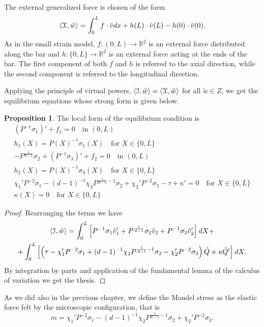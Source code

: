 \documentclass[a4paper,10pt,oneside]{amsbook}
\numberwithin{section}{chapter}
\numberwithin{equation}{chapter}
\theoremstyle{definition}
\newtheorem{prop}{Proposition}[chapter]
\DeclarePairedDelimiter{\dual}{\langle}{\rangle}
\begin{document}
The external generalized force is chosen of the form
\[
\dual{\mathcal X,\tilde w}=\int_0^Lf\cdot\tilde vdx+h(L)\cdot\tilde v(L)-h(0)\cdot\tilde v(0).
\]
As in the small strain model, $f\colon(0,L)\to\mathbb{R}^2$ is an external force distributed along the bar and $h\colon\{0,L\}\to\mathbb{R}^2$ is an external force acting at the ends of the bar. The first component of both $f$ and $h$ is referred to the axial direction, while the second component is referred to the longitudinal direction.

Applying the principle of virtual powers, $\dual{\mathcal{I},\tilde w}=\dual{\mathcal{X},\tilde w}$ for all $\tilde w\in Z$, we get the equilibrium equations whose strong form is given below.
\begin{prop}
The local form of the equilibrium condition is
\begin{subequations}
\label{eqn:indeinite-equation-necking-large}
\begin{gather}
(P^{-1}\sigma_1)'+f_1=0\quad\text{in $(0,L)$} \\
h_1(X)=P(X)^{-1}\sigma_1(X)\quad\text{for $X\in\{0,L\}$} \\
-P^{\frac{1}{d-1}}\sigma_2+(P^{-1}\sigma_3)'+f_2=0\quad\text{in $(0,L)$} \\
h_2(X)=P(X)^{-1}\sigma_3(X)\quad\text{for $X\in\{0,L\}$} \\
\chi_1'P^{-2}\sigma_1-(d-1)^{-1}\chi_2P^{\frac{1}{d-1}-1}\sigma_2+\chi_2'P^{-2}\sigma_3-\tau+\kappa'=0\quad\text{for $X\in\{0,L\}$} \\
\kappa(X)=0\quad\text{for $X\in\{0,L\}$}
\end{gather}
\end{subequations}
\end{prop}
\begin{proof}
Rearranging the terms we have
\begin{multline*}
\dual{\mathcal{I},\tilde w}=\int_0^L\left[P^{-1}\sigma_1\tilde v_1'+P^{\frac{1}{d-1}}\sigma_2\tilde v_2+P^{-1}\sigma_3\tilde v_2'\right]dX+\\
+\int_0^L\left[\left(\tau-\chi_1'P^{-2}\sigma_1+(d-1)^{-1}\chi_2P^{\frac{1}{d-1}-1}\sigma_2-\chi_2'P^{-2}\sigma_3\right)\tilde Q+\kappa\tilde Q'\right]dX.
\end{multline*}
By integration by parts and application of the fundamental lemma of the calculus of variation we get the thesis.
\end{proof}
As we did also in the previous chapter, we define the Mandel stress as the elastic force felt by the microscopic configuration, that is
\begin{equation}
\label{eqn:neck-large-mandel}
m=\chi_1'P^{-2}\sigma_1-(d-1)^{-1}\chi_2P^{\frac{1}{d-1}-1}\sigma_2+\chi_2'P^{-2}\sigma_3.
\end{equation}
\end{document}

